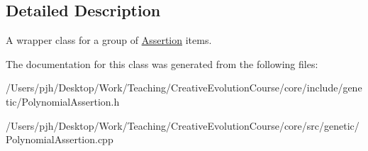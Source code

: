 \subsection{Detailed Description}
A wrapper class for a group of \hyperlink{class_assertion}{Assertion} items. 

The documentation for this class was generated from the following files\-:\begin{DoxyCompactItemize}
\item 
/\-Users/pjh/\-Desktop/\-Work/\-Teaching/\-Creative\-Evolution\-Course/core/include/genetic/Polynomial\-Assertion.\-h\item 
/\-Users/pjh/\-Desktop/\-Work/\-Teaching/\-Creative\-Evolution\-Course/core/src/genetic/Polynomial\-Assertion.\-cpp\end{DoxyCompactItemize}
